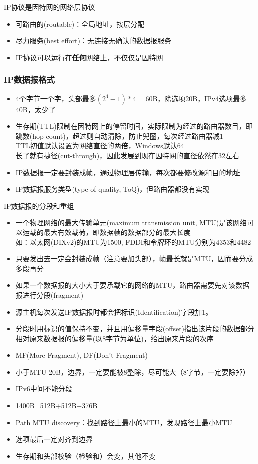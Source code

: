 IP协议是因特网的网络层协议
\begin{itemize}
\item 可路由的(routable)：全局地址，按层分配
\item 尽力服务(best effort)：无连接无确认的数据报服务
\item IP协议可以运行在\textbf{任何}网络上，不仅仅是因特网
\end{itemize}

\subsubsection{IP数据报格式}
\begin{itemize}
\item 4个字节一个字，头部最多$(2^4-1)*4=60$B，除选项20B，IPv4选项最多40B，太少了
\item 生存期(TTL)限制在因特网上的停留时间，实际限制为经过的路由器数目，即跳数(hop count)，超过则自动清除，防止兜圈，每次经过路由器减1\\
TTL初值默认设置为网络直径的两倍，Windows默认64\\
长了就有捷径(cut-through)，因此发展到现在因特网的直径依然在32左右
\item IP数据报一定要封装成帧，通过物理层传输，每次都要修改源和目的地址
\item IP数据报服务类型(type of quality, ToQ)，但路由器都没有实现
\end{itemize}

IP数据报的分段和重组
\begin{itemize}
\item 一个物理网络的最大传输单元(maximum transmission unit, MTU)是该网络可以运载的最大有效载荷，即数据帧的数据部分的最大长度\\
如：以太网(DIXv2)的MTU为1500, FDDI和令牌环的MTU分别为4353和4482
\item 只要发出去一定会封装成帧（注意要加头部），帧最长就是MTU，因而要分成多段再分
\item 如果一个数据报的大小大于要承载它的网络的MTU，路由器需要先对该数据报进行分段(fragment)
\item 源主机每次发送IP数据报时都会把标识(Identification)字段加1。
\item 分段时用标识的值保持不变，并且用偏移量字段(offset)指出该片段的数据部分相对原来数据报的偏移量(以8字节为单位)，给出原来片段的次序
\item MF(More Fragment), DF(Don't Fragment)
\item 小于MTU-20B，边界，一定要能被8整除，尽可能大（8字节，一定要除掉）
\item IPv6中间不能分段
\item 1400B=512B+512B+376B
\item Path MTU discovery：找到路径上最小的MTU，发现路径上最小MTU
\item 选项最后一定对齐到边界
\item 生存期和头部校验（检验和）会变，其他不变
\end{itemize}

